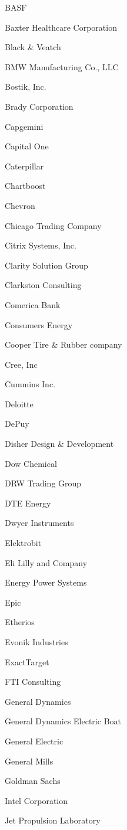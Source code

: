\documentclass[twoside]{article}
\begin{document}
\begin{center}
\begin{multicols}{5}
\begin{FlushLeft}
\begin{compactitem}
\item BASF
\item Baxter Healthcare Corporation
\item Black \& Veatch
\item BMW Manufacturing Co., LLC
\item Bostik, Inc.
\item Brady Corporation
\item Capgemini
\item Capital One
\item Caterpillar
\item Chartboost
\item Chevron
\item Chicago Trading Company
\item Citrix Systems, Inc.
\item Clarity Solution Group
\item Clarkston Consulting
\item Comerica Bank
\item Consumers Energy
\item Cooper Tire \& Rubber company
\item Cree, Inc
\item Cummins Inc.
\item Deloitte
\item DePuy
\item Disher Design \& Development
\item Dow Chemical
\item DRW Trading Group
\item DTE Energy
\item Dwyer Instruments
\item Elektrobit
\item Eli Lilly and Company
\item Energy Power Systems
\item Epic
\item Etherios
\item Evonik Industries
\item ExactTarget
\item FTI Consulting
\item General Dynamics
\item General Dynamics Electric Boat
\item General Electric
\item General Mills
\item Goldman Sachs
\item Intel Corporation
\item Jet Propulsion Laboratory

\end{compactitem}
\end{FlushLeft}
\end{multicols}
\end{center}
\end{document}
